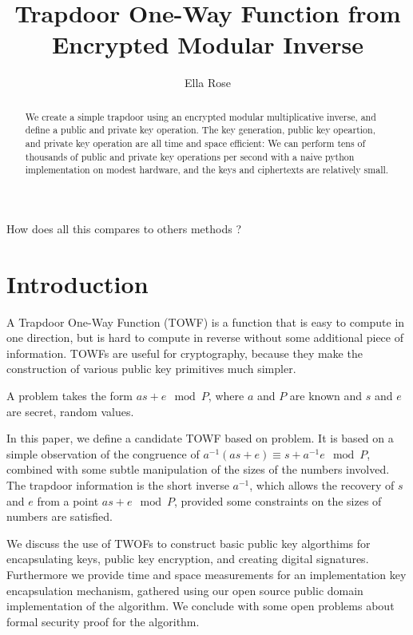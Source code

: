 \documentclass[preprint]{iacrtrans}
\author{Ella Rose}
\institute{Paso Robles, CA \email{python_pride@protonmail.com}}
\title[Trapdoor One-Way Function from Encrypted Modular Inverse]{Trapdoor One-Way Function from Encrypted Modular Inverse}
\begin{document}
\maketitle


\begin{abstract}
 We create a simple trapdoor using an encrypted modular multiplicative inverse, and define a public and private key operation. The key generation, public key opeartion, and private key operation are all time and space efficient: We can perform tens of thousands of public and private key operations per second with a naive python implementation on modest hardware, and the keys and ciphertexts are relatively small. 
 \end{abstract}

\todototoc
\listoftodos

How does all this compares to others methods ?

\section{Introduction}
A Trapdoor One-Way Function (TOWF) is a function that is easy to compute in one direction, but is hard to compute in reverse without some additional piece of information. TOWFs are useful for cryptography, because they make the construction of various public key primitives much simpler.

A  problem takes the form $a s + e \mod P$, where $a$ and $P$ are known and $s$ and $e$ are secret, random values.

In this paper, we define a candidate TOWF based on  problem. It is based on a simple observation of the congruence of $a^{-1}(a s + e) \equiv s + a^{-1} e \mod P$, combined with some subtle manipulation of the sizes of the numbers involved. The trapdoor information is the short inverse $a^{-1}$, which allows the recovery of $s$ and $e$ from a point $a s + e \mod P$, provided some constraints on the sizes of numbers are satisfied.

We discuss the use of TWOFs to construct basic public key algorthims for encapsulating keys, public key encryption, and creating digital signatures. Furthermore we provide time and space measurements for an implementation key encapsulation mechanism, gathered using our open source public domain implementation of the algorithm. We conclude with some open problems about formal security proof for the algorithm.
\end{document}
